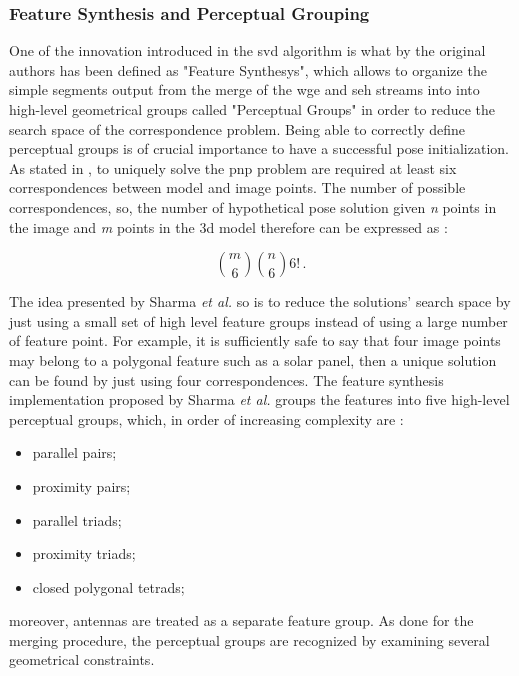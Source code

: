 \subsubsection{Feature Synthesis and Perceptual Grouping}
One of the innovation introduced in the \acrshort{svd} algorithm is what by the original authors has been defined as "Feature Synthesys", which allows to organize the simple segments output from the merge of the \acrshort{wge} and \acrshort{seh} streams into into high-level geometrical groups called "Perceptual Groups" in order to reduce the search space of the correspondence problem. Being able to correctly define perceptual groups is of crucial importance to have a successful pose initialization.
As stated in \cite{10.1145/358669.358692}, to uniquely solve the \acrshort{pnp} problem are required at least six correspondences between model and image points. The number of possible correspondences, so, the number of hypothetical pose solution given \textit{n} points in the image and \textit{m} points in the \acrshort{3d} model therefore can be expressed as \cite{Sharma2018}:

\begin{equation*}
  \binom{m}{6} \binom{n}{6} 6! \,.
\end{equation*}

The idea presented by Sharma \textit{et al.} so is to reduce the solutions' search space by just using a small set of high level feature groups instead of using a large number of feature point. For example, it is sufficiently safe to say that four image points may belong to a polygonal feature such as a solar panel, then a unique solution can be found by just using four correspondences. The feature synthesis implementation proposed by Sharma \textit{et al.} groups the features into five high-level perceptual groups, which, in order of increasing complexity are :

\begin{itemize}
  \item parallel pairs;
  \item proximity pairs;
  \item parallel triads;
  \item proximity triads;
  \item closed polygonal tetrads;
\end{itemize}

moreover, antennas are treated as a separate feature group.
As done for the merging procedure, the perceptual groups are recognized by examining several geometrical constraints.

